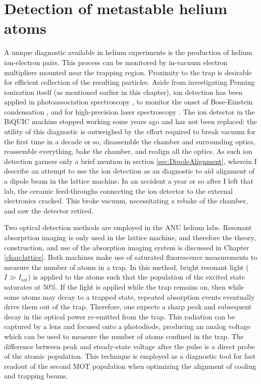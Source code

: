 \section{Detection of metastable helium atoms}
\label{sec:he_detection}
	A unique diagnostic available in helium experiments is the production of helium ion-electron pairs.
	This process can be monitored by in-vacuum electron multipliers mounted near the trapping region.
	Proximity to the trap is desirable for efficient collection of the resulting particles.
	Aside from investigating Penning ionization itself (as mentioned earlier in this chapter), ion detection has been applied in photoassociation spectroscopy \cite{Herschbach00,Koelemeij04}, to monitor the onset of Bose-Einstein condensation \cite{Tychkov06}, and for high-precision laser spectroscopy \cite{Rengelink18}.
	The ion detector in the BiQUIC machine stopped working some years ago and has not been replaced: the utility of this diagnostic is outweighed by the effort required to break vacuum for the first time in a decade or so, disassemble the chamber and surrounding optics, reassemble everything, bake the chamber, and realign all the optics.
	As such ion detection garners only a brief mention in section \ref{sec:DipoleAlignment}, wherein I describe an attempt to use the ion detection as an diagnostic to aid alignment of a dipole beam in the lattice machine.
	In an accident a year or so after I left that lab, the ceramic feed-throughs connecting the ion detector to the external electronics cracked.
	This broke vacuum, necessitating a rebake of the chamber, and saw the detector retired.
	
	Two optical detection methods are employed in the ANU helium labs.
	Resonant absorprtion imaging is only used in the lattice machine, and therefore the theory, construction, and use of the absorption imaging system is discussed in Chapter \ref{chap:lattice}.
	Both machines make use of saturated fluorescence measurements to measure the number of atoms in a trap.
	In this method, bright resonant light ($I\gg I_\textrm{sat}$) is applied to the atoms such that the population of the excited state saturates at 50\%.
	If the light is applied while the trap remains on, then while some atoms may decay to a trapped state, repeated absorption events eventually drive them out of the trap.
	Therefore, one expects a sharp peak and subsequent decay in the optical power re-emitted from the trap.
	This radiation can be captured by a lens and focused onto a photodiode, producing an analog voltage which can be used to measure the number of atoms confined in the trap.
	The difference between peak and steady-state voltage after the pulse is a direct probe of the atomic population.
	This technique is employed as a diagnostic tool for fast readout of the second MOT population when optimizing the alignment of cooling and trapping beams. 


